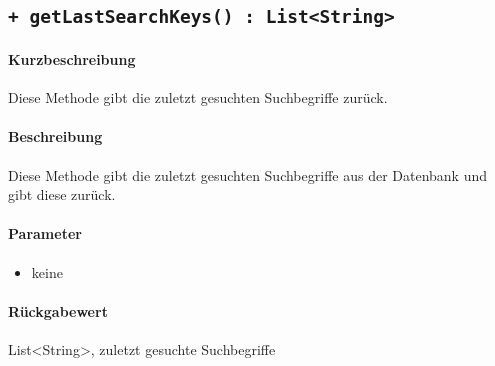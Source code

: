 \subsection{\texttt{+ getLastSearchKeys() : List<String>}}%
\paragraph*{Kurzbeschreibung}
Diese Methode gibt die zuletzt gesuchten Suchbegriffe zurück.
\paragraph*{Beschreibung}
Diese Methode gibt die zuletzt gesuchten Suchbegriffe aus der Datenbank und gibt diese zurück.
\paragraph*{Parameter}
\begin{itemize}
    \item keine
\end{itemize}
\paragraph*{Rückgabewert}
List<String>, zuletzt gesuchte Suchbegriffe